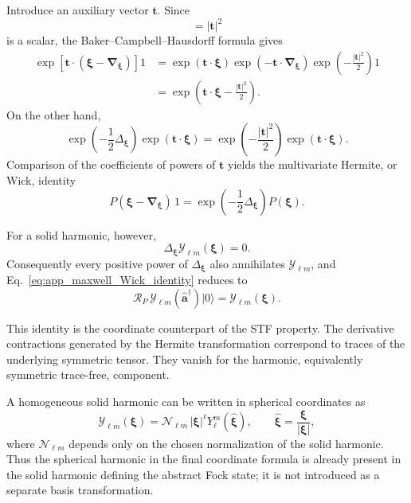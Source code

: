 \documentclass[11pt,oneside]{article}
\numberwithin{equation}{section}
\theoremstyle{definition}
\begin{document}
Introduce an auxiliary vector $\bm t$.  Since
\begin{equation}
[
\bm t\cdot\bm\xi,
-\bm t\cdot\bm\nabla_{\bm\xi}
]
=
|\bm t|^2
\end{equation}
is a scalar, the Baker--Campbell--Hausdorff formula gives
\begin{align}
\exp\!\left[
\bm t\cdot
(\bm\xi-\bm\nabla_{\bm\xi})
\right]1
&=
\exp(\bm t\cdot\bm\xi)
\exp(-\bm t\cdot\bm\nabla_{\bm\xi})
\exp\!\left(-\frac{|\bm t|^2}{2}\right)1
\nonumber\\
&=
\exp\!\left(
\bm t\cdot\bm\xi-\frac{|\bm t|^2}{2}
\right).
\label{eq:app_maxwell_Hermite_generating}
\end{align}
On the other hand,
\begin{equation}
\exp\!\left(-\frac12\Delta_{\bm\xi}\right)
\exp(\bm t\cdot\bm\xi)
=
\exp\!\left(-\frac{|\bm t|^2}{2}\right)
\exp(\bm t\cdot\bm\xi).
\end{equation}
Comparison of the coefficients of powers of $\bm t$ yields the
multivariate Hermite, or Wick, identity
\begin{equation}
P(\bm\xi-\bm\nabla_{\bm\xi})\,1
=
\exp\!\left(-\frac12\Delta_{\bm\xi}\right)
P(\bm\xi).
\label{eq:app_maxwell_Wick_identity}
\end{equation}

For a solid harmonic, however,
\begin{equation}
\Delta_{\bm\xi}\mathcal Y_{\ell m}(\bm\xi)=0.
\end{equation}
Consequently every positive power of $\Delta_{\bm\xi}$ also annihilates
$\mathcal Y_{\ell m}$, and
Eq.~\eqref{eq:app_maxwell_Wick_identity} reduces to
\begin{equation}
\mathcal R_P\,
\mathcal Y_{\ell m}(\hat{\bm a}^\dagger)|0\rangle
=
\mathcal Y_{\ell m}(\bm\xi).
\label{eq:app_maxwell_solid_harmonic_RP}
\end{equation}

This identity is the coordinate counterpart of the STF property.  The
derivative contractions generated by the Hermite transformation correspond
to traces of the underlying symmetric tensor.  They vanish for the
harmonic, equivalently symmetric trace-free, component.

A homogeneous solid harmonic can be written in spherical coordinates as
\begin{equation}
\mathcal Y_{\ell m}(\bm\xi)
=
\mathcal N_{\ell m}\,
|\bm\xi|^\ell
Y_\ell^m(\widehat{\bm\xi}),
\qquad
\widehat{\bm\xi}
=
\frac{\bm\xi}{|\bm\xi|},
\label{eq:app_maxwell_solid_to_spherical}
\end{equation}
where $\mathcal N_{\ell m}$ depends only on the chosen normalization of the
solid harmonic.  Thus the spherical harmonic in the final coordinate
formula is already present in the solid harmonic defining the abstract
Fock state; it is not introduced as a separate basis transformation.
\end{document}
